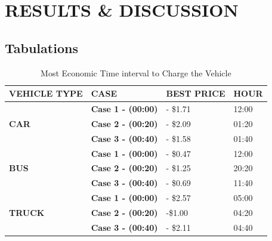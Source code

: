 
	\chapter{RESULTS \& DISCUSSION}
	\label{chap:results}
	
	\section{Tabulations}
	
		\begin{table}[]
			\caption{Most Economic Time interval to Charge the Vehicle}
			\centering
		\begin{tabular}{|l|l|l|l|}
			\hline
			\textbf{VEHICLE TYPE}           & \textbf{CASE}         & \textbf{BEST PRICE} & \textbf{HOUR} \\ \hline
			\multirow{3}{*}{\textbf{CAR}}   & \textbf{Case 1 - (00:00)} & - \$1.71            & 12:00         \\ \cline{2-4} 
			& \textbf{Case 2 - (00:20)} & - \$2.09            & 01:20         \\ \cline{2-4} 
			& \textbf{Case 3 - (00:40)} & - \$1.58            & 01:40         \\ \hline
			\multirow{3}{*}{\textbf{BUS}}   & \textbf{Case 1 - (00:00)} & - \$0.47            & 12:00         \\ \cline{2-4} 
			& \textbf{Case 2 - (00:20)} & - \$1.25            & 20:20         \\ \cline{2-4} 
			& \textbf{Case 3 - (00:40)} & - \$0.69            & 11:40         \\ \hline
			\multirow{3}{*}{\textbf{TRUCK}} & \textbf{Case 1 - (00:00)} & - \$2.57            & 05:00         \\ \cline{2-4} 
			& \textbf{Case 2 - (00:20)} & -\$1.00             & 04:20         \\ \cline{2-4} 
			& \textbf{Case 3 - (00:40)} & - \$2.11            & 04:40         \\ \hline
		\end{tabular}
	\end{table}



